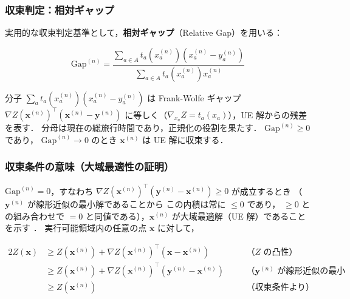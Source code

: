 \subsubsection*{収束判定：相対ギャップ}

実用的な収束判定基準として，\textbf{相対ギャップ}（Relative Gap）を用いる：

\begin{equation}
  \mathrm{Gap}^{(n)}
  = \frac{\displaystyle\sum_{a \in A}
          t_a\!\left(x_a^{(n)}\right)
          \left(x_a^{(n)} - y_a^{(n)}\right)}
         {\displaystyle\sum_{a \in A}
          t_a\!\left(x_a^{(n)}\right) x_a^{(n)}}
  \label{eq:relative-gap}
\end{equation}

分子 $\sum_a t_a(x_a^{(n)})(x_a^{(n)} - y_a^{(n)})$
は Frank-Wolfe ギャップ
$\nabla Z(\boldsymbol{x}^{(n)})^{\!\top}(\boldsymbol{x}^{(n)}-\boldsymbol{y}^{(n)})$
に等しく（$\nabla_{x_a} Z = t_a(x_a)$），UE 解からの残差を表す．
分母は現在の総旅行時間であり，正規化の役割を果たす．
$\mathrm{Gap}^{(n)} \geq 0$ であり，
$\mathrm{Gap}^{(n)} \to 0$ のとき $\boldsymbol{x}^{(n)}$ は UE 解に収束する．

\subsubsection*{収束条件の意味（大域最適性の証明）}

$\mathrm{Gap}^{(n)} = 0$，すなわち
$\nabla Z(\boldsymbol{x}^{(n)})^{\!\top}
(\boldsymbol{y}^{(n)} - \boldsymbol{x}^{(n)}) \geq 0$
が成立するとき
（$\boldsymbol{y}^{(n)}$ が線形近似の最小解であることから
この内積は常に $\leq 0$ であり，
$\geq 0$ との組み合わせで $= 0$ と同値である），$\boldsymbol{x}^{(n)}$ が大域最適解（UE 解）であることを示す
\cite{FrankWolfe1956,Pokutta2024}．
実行可能領域内の任意の点 $\boldsymbol{x}$ に対して，

\begin{alignat}{2}
  Z(\boldsymbol{x})
  &\geq Z(\boldsymbol{x}^{(n)})
    + \nabla Z(\boldsymbol{x}^{(n)})^{\!\top}(\boldsymbol{x} - \boldsymbol{x}^{(n)})
  && \quad \text{（$Z$ の凸性）}
  \label{eq:proof-convex}\\
  &\geq Z(\boldsymbol{x}^{(n)})
    + \nabla Z(\boldsymbol{x}^{(n)})^{\!\top}(\boldsymbol{y}^{(n)} - \boldsymbol{x}^{(n)})
  && \quad \text{（$\boldsymbol{y}^{(n)}$ が線形近似の最小解）}
  \label{eq:proof-min}\\
  &\geq Z(\boldsymbol{x}^{(n)})
  && \quad \text{（収束条件より）}
  \label{eq:proof-gap}
\end{alignat}

